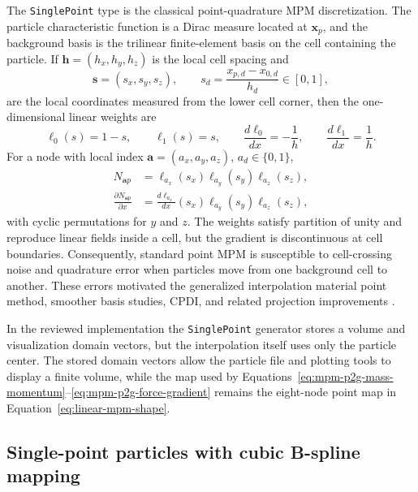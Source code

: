 The \texttt{SinglePoint} type is the classical point-quadrature MPM discretization.  The particle characteristic function is a Dirac measure located at $\boldsymbol{x}_p$, and the background basis is the trilinear finite-element basis on the cell containing the particle.  If $\boldsymbol{h}=(h_x,h_y,h_z)$ is the local cell spacing and
\begin{equation}
  \boldsymbol{s}=(s_x,s_y,s_z),
  \qquad
  s_d=\frac{x_{p,d}-x_{0,d}}{h_d}\in[0,1],
  \label{eq:single-point-local-coord}
\end{equation}
are the local coordinates measured from the lower cell corner, then the one-dimensional linear weights are
\begin{equation}
  \ell_0(s)=1-s,
  \qquad
  \ell_1(s)=s,
  \qquad
  \frac{d\ell_0}{dx}=-\frac{1}{h},
  \qquad
  \frac{d\ell_1}{dx}=\frac{1}{h}.
  \label{eq:linear-mpm-weights}
\end{equation}
For a node with local index $\boldsymbol{a}=(a_x,a_y,a_z)$, $a_d\in\{0,1\}$,
\begin{align}
  N_{\boldsymbol{a}p}
    &= \ell_{a_x}(s_x)\ell_{a_y}(s_y)\ell_{a_z}(s_z),
  \label{eq:linear-mpm-shape}\\
  \frac{\partial N_{\boldsymbol{a}p}}{\partial x}
    &= \frac{d\ell_{a_x}}{dx}(s_x)\ell_{a_y}(s_y)\ell_{a_z}(s_z),
  \label{eq:linear-mpm-grad-x}
\end{align}
with cyclic permutations for $y$ and $z$.  The weights satisfy partition of unity and reproduce linear fields inside a cell, but the gradient is discontinuous at cell boundaries.  Consequently, standard point MPM is susceptible to cell-crossing noise and quadrature error when particles move from one background cell to another.  These errors motivated the generalized interpolation material point method, smoother basis studies, CPDI, and related projection improvements \cite{bardenhagen2004gimp,steffen2008quadrature,steffen2008choices,wallstedt2007projection}.

In the reviewed implementation the \texttt{SinglePoint} generator stores a volume and visualization domain vectors, but the interpolation itself uses only the particle center.  The stored domain vectors allow the particle file and plotting tools to display a finite volume, while the map used by Equations~\eqref{eq:mpm-p2g-mass-momentum}--\eqref{eq:mpm-p2g-force-gradient} remains the eight-node point map in Equation~\eqref{eq:linear-mpm-shape}.

\subsection{Single-point particles with cubic B-spline mapping}
\label{subsec:single-point-bspline}

